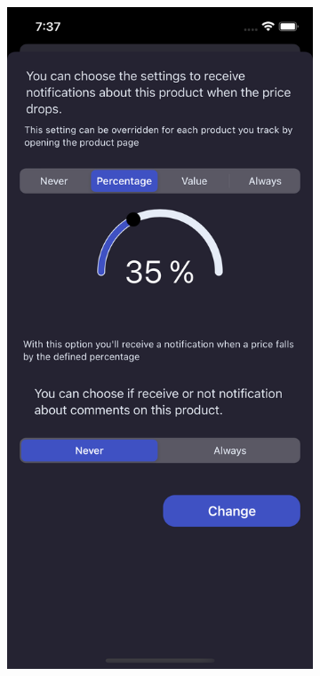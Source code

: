 \begin{figure}[h!]
        \centering
        \begin{subfigure}[b]{0.3\textwidth}
            \centering
            \includegraphics[width=\textwidth]{images/interfaces/percentage_notification_screen.png}

\end{subfigure}
\end{figure}
